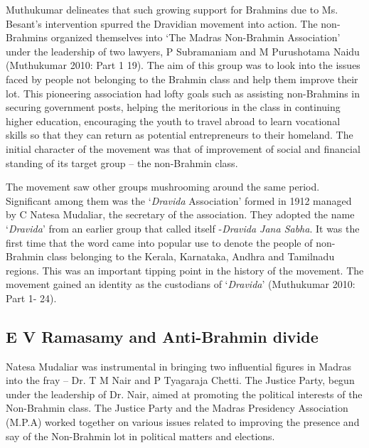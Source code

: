 Muthukumar delineates that such growing support for Brahmins due to Ms. Besant’s intervention spurred the Dravidian movement into action. The non-Brahmins organized themselves into ‘The Madras Non-Brahmin Association’ under the leadership of two lawyers, P Subramaniam and M Purushotama Naidu (Muthukumar 2010: Part 1 19). The aim of this group was to look into the issues faced by people not belonging to the Brahmin class and help them improve their lot. This pioneering association had lofty goals such as assisting non-Brahmins in securing government posts, helping the meritorious in the class in continuing higher education, encouraging the youth to travel abroad to learn vocational skills so that they can return as potential entrepreneurs to their homeland. The initial character of the movement was that of improvement of social and financial standing of its target group – the non-Brahmin class.

The movement saw other groups mushrooming around the same period. Significant among them was the ‘\textit{Dravida} Association’ formed in 1912 managed by C Natesa Mudaliar, the secretary of the association. They adopted the name ‘\textit{Dravida}’ from an earlier group that called itself -\textit{Dravida Jana Sabha}. It was the first time that the word came into popular use to denote the people of non-Brahmin class belonging to the Kerala, Karnataka, Andhra and Tamilnadu regions. This was an important tipping point in the history of the movement. The movement gained an identity as the custodians of ‘\textit{Dravida}’ (Muthukumar 2010: Part 1- 24).


\subsection*{E V Ramasamy and Anti-Brahmin divide}

Natesa Mudaliar was instrumental in bringing two influential figures in Madras into the fray – Dr. T M Nair and P Tyagaraja Chetti. The Justice Party, begun under the leadership of Dr. Nair, aimed at promoting the political interests of the Non-Brahmin class. The Justice Party and the Madras Presidency Association (M.P.A) worked together on various issues related to improving the presence and say of the Non-Brahmin lot in political matters and elections.

